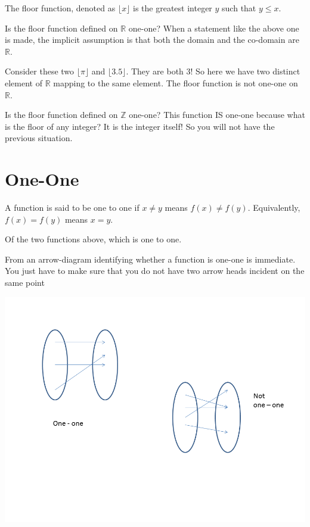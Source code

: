 \documentclass[12pt]{article}
\begin{document}
The floor function, denoted as $\lfloor x \rfloor$ is the greatest integer $y$ such that $y \le x$.

\medskip

Is the floor function defined on $\mathbb{R}$ one-one? 
When a statement like the above one is made, the implicit assumption is that both the domain and the co-domain are $\mathbb{R}$. 

Consider these two $\lfloor \pi \rfloor$ and $\lfloor 3.5 \rfloor$. They are both 3! So here we have two distinct element of $\mathbb{R}$ mapping to the same element. The floor function is not one-one on $\mathbb{R}$.

\medskip

Is the floor function defined on $\mathbb{Z}$ one-one?
This function IS one-one because what is the floor of any integer? It is the integer itself!
So you will not have the previous situation. 

\section*{One-One}
A function is said to be one to one if $x \neq y$ means $f(x) \neq f(y)$. Equivalently, 
$f(x) = f(y)$ means $x = y$. 

Of the two functions above, which is one to one. 

From an arrow-diagram identifying whether a function is one-one is immediate. You just have to make sure that you do not have two arrow heads incident on the same point

\includegraphics[scale=0.6]{oneone.png}
\end{document}
